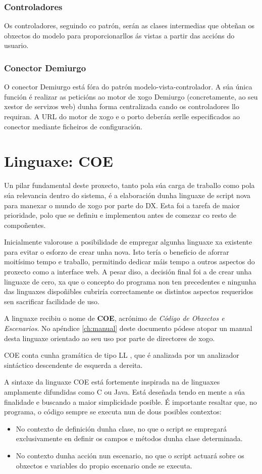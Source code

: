 \subsubsection{Controladores}
Os controladores, seguindo co patrón, serán as clases intermedias que obteñan
os obxectos do modelo para proporcionarllos ás vistas a partir das accións do
usuario.

\subsubsection{Conector Demiurgo}
O conector Demiurgo está fóra do patrón modelo-vista-controlador. A súa única
función é realizar as peticións ao motor de xogo Demiurgo (concretamente, ao
seu xestor de servizos web) dunha forma centralizada cando os controladores llo
requiran. A URL do motor de xogo e o porto deberán serlle especificados ao
conector mediante ficheiros de configuración.

\section{Linguaxe: COE}
Un pilar fundamental deste proxecto, tanto pola súa carga de traballo como pola
súa relevancia dentro do sistema, é a elaboración dunha linguaxe de script nova
para manexar o mundo de xogo por parte do DX. Esta foi a tarefa de maior
prioridade, polo que se definiu e implementou antes de comezar co resto de
compoñentes.
\par
Inicialmente valorouse a posibilidade de empregar algunha linguaxe xa existente
para evitar o esforzo de crear unha nova. Isto tería o beneficio de aforrar
moitísimo tempo e traballo, permitindo dedicar máis tempo a outros aspectos do
proxecto como a interface web. A pesar diso, a decisión final foi a de crear
unha linguaxe de cero, xa que o concepto do programa non ten precedentes e
ningunha das linguaxes dispoñibles cubriría correctamente os distintos aspectos
requeridos sen sacrificar facilidade de uso.
\par
A linguaxe recibiu o nome de \textbf{COE}, acrónimo de \textit{Código de
Obxectos e Escenarios}. No apéndice \ref{ch:manual} deste documento pódese
atopar un manual desta linguaxe orientado ao seu uso por parte de directores de
xogo.
\par
COE conta cunha gramática de tipo LL \cite{compiladores}, que é analizada por un
analizador sintáctico descendente de esquerda a dereita.
\par
A sintaxe da linguaxe COE está fortemente inspirada na de linguaxes amplamente
difundidas como C ou Java. Está deseñada tendo en mente a súa finalidade e
buscando a maior simplicidade posible. É importante resaltar que, no programa,
o código sempre se executa nun de dous posibles contextos:
\begin{itemize}
  \item No contexto de definición dunha clase, no que o script se empregará
  exclusivamente en definir os campos e métodos dunha clase determinada.
  \item No contexto dunha acción nun escenario, no que o script actuará sobre os
  obxectos e variables do propio escenario onde se executa.
\end{itemize}

